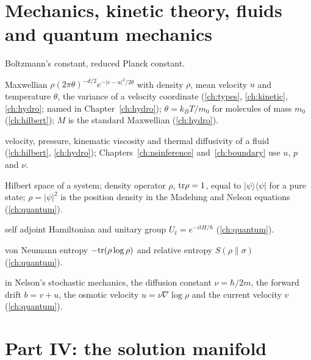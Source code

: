 \section*{Mechanics, kinetic theory, fluids and quantum mechanics}

\begin{description}[leftmargin=2.2em,labelwidth=1.8em,labelsep=0.4em,itemsep=0pt,parsep=0pt]
\item[$k_B,\ \hbar$] Boltzmann's constant, reduced Planck constant.
\item[$M_{\rho,u,\theta}$] Maxwellian $\rho(2\pi\theta)^{-d/2}e^{-|v-u|^2/2\theta}$ with density $\rho$, mean velocity $u$ and temperature $\theta$, the variance of a velocity coordinate (\ref{ch:types}, \ref{ch:kinetic}, \ref{ch:hydro}; named in Chapter~\ref{ch:hydro}); $\theta=k_BT/m_0$ for molecules of mass $m_0$ (\ref{ch:hilbert}); $M$ is the standard Maxwellian (\ref{ch:hydro}).
\item[$u,\ p,\ \nu,\ \kappa$] velocity, pressure, kinematic viscosity and thermal diffusivity of a fluid (\ref{ch:hilbert}, \ref{ch:hydro}); Chapters~\ref{ch:nsinference} and~\ref{ch:boundary} use $u$, $p$ and $\nu$.
\item[$\mathcal H,\ \rho,\ \psi$] Hilbert space of a system; density operator $\rho$, $\mathrm{tr}\rho=1$, equal to $|\psi\rangle\langle\psi|$ for a pure state; $\rho=|\psi|^2$ is the position density in the Madelung and Nelson equations (\ref{ch:quantum}).
\item[$H,\ U_t$] self adjoint Hamiltonian and unitary group $U_t=e^{-itH/\hbar}$ (\ref{ch:quantum}).
\item[$S(\rho)$] von Neumann entropy $-\mathrm{tr}(\rho\log\rho)$ and relative entropy $S(\rho\|\sigma)$ (\ref{ch:quantum}).
\item[$\nu,\ b,\ u,\ v$] in Nelson's stochastic mechanics, the diffusion constant $\nu=\hbar/2m$, the forward drift $b=v+u$, the osmotic velocity $u=\nu\nabla\log\rho$ and the current velocity $v$ (\ref{ch:quantum}).
\end{description}

\section*{Part IV: the solution manifold}

